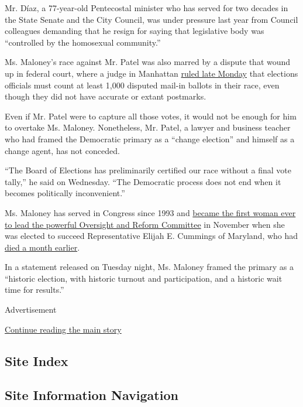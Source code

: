 Mr. Díaz, a 77-year-old Pentecostal minister who has served for two
decades in the State Senate and the City Council, was under pressure
last year from Council colleagues demanding that he resign for saying
that legislative body was ``controlled by the homosexual community.''

Ms. Maloney's race against Mr. Patel was also marred by a dispute that
wound up in federal court, where a judge in Manhattan
\href{https://www.nytimes.com/2020/08/03/nyregion/nyc-congress-carolyn-maloney-ballots.html}{ruled
late Monday} that elections officials must count at least 1,000 disputed
mail-in ballots in their race, even though they did not have accurate or
extant postmarks.

Even if Mr. Patel were to capture all those votes, it would not be
enough for him to overtake Ms. Maloney. Nonetheless, Mr. Patel, a lawyer
and business teacher who had framed the Democratic primary as a ``change
election'' and himself as a change agent, has not conceded.

``The Board of Elections has preliminarily certified our race without a
final vote tally,'' he said on Wednesday. ``The Democratic process does
not end when it becomes politically inconvenient.''

Ms. Maloney has served in Congress since 1993 and
\href{https://www.nytimes.com/2019/11/20/us/politics/carolyn-maloney-oversight-committee.html}{became
the first woman ever to lead the powerful Oversight and Reform
Committee} in November when she was elected to succeed Representative
Elijah E. Cummings of Maryland, who had
\href{https://www.nytimes.com/2019/10/17/us/politics/elijah-cummings-death-illness.html}{died
a month earlier}.

In a statement released on Tuesday night, Ms. Maloney framed the primary
as a ``historic election, with historic turnout and participation, and a
historic wait time for results.''

Advertisement

\protect\hyperlink{after-bottom}{Continue reading the main story}

\hypertarget{site-index}{%
\subsection{Site Index}\label{site-index}}

\hypertarget{site-information-navigation}{%
\subsection{Site Information
Navigation}\label{site-information-navigation}}


